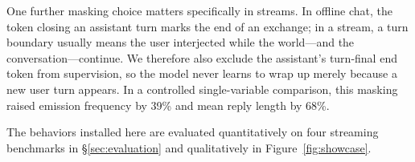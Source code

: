 One further masking choice matters specifically in streams. In offline
chat, the token closing an assistant turn marks the end of an exchange;
in a stream, a turn boundary usually means the user interjected while the
world---and the conversation---continue. We therefore also exclude the
assistant's turn-final end token from supervision, so the model never
learns to wrap up merely because a new user turn appears. In a controlled
single-variable comparison, this masking raised emission frequency by
39\% and mean reply length by 68\%.

The behaviors installed here are evaluated quantitatively on four
streaming benchmarks in \S\ref{sec:evaluation} and qualitatively in
Figure~\ref{fig:showcase}.
